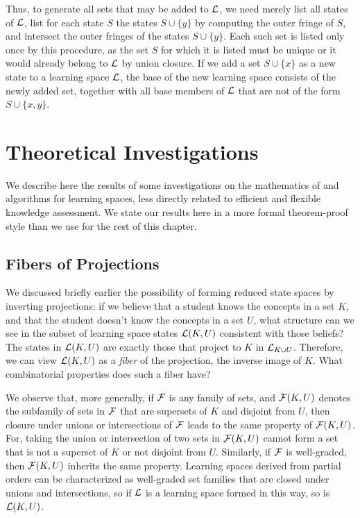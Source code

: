 \documentclass[11pt]{llncs}
\begin{document}
{Thus, to generate all sets that may be added to $\cal L$, we need merely list all states of $\cal L$, list for each state $S$ the states $S\cup\{y\}$ by computing the outer fringe of $S$, and intersect the outer fringes of the states $S\cup\{y\}$. Each such set is listed only once by this procedure, as the set $S$ for which it is listed must be unique or it would already belong to $\cal L$ by union closure. If we add a set $S\cup\{x\}$ as a new state to a learning space $\cal L$, the base of the new learning space consists of the newly added set, together with all base members of $\cal L$ that are not of the form $S\cup\{x,y\}$.

\section{Theoretical Investigations}

We describe here the results of some investigations on the mathematics of and algorithms for learning spaces, less directly related to efficient and flexible knowledge assessment. We state our results here in a more formal theorem-proof style than we use for the rest of this chapter.
 
\subsection{Fibers of Projections}

We discussed briefly earlier the possibility of forming reduced state spaces by inverting projections: if we believe that a student knows the concepts in a set $K$, and that the student doesn't know the concepts in a set $U$, what structure can we see in the subset of learning space states ${\cal L}(K,U)$ consistent with those beliefs? The states in ${\cal L}(K,U)$ are exactly those that project to $K$ in ${\cal L}_{K\cup U}$. Therefore, we can view ${\cal L}(K,U)$ as a \emph{fiber} of the projection, the inverse image of $K$. What combinatorial properties does such a fiber have?

We observe that, more generally, if $\cal F$ is any family of sets, and ${\cal F}(K,U)$ denotes the subfamily of sets in $\cal F$ that are supersets of $K$ and disjoint from $U$, then closure under unions or intersections of $\cal F$ leads to the same property of ${\cal F}(K,U)$. For, taking the union or intersection of two sets in ${\cal F}(K,U)$ cannot form a set that is not a superset of $K$ or not disjoint from $U$.
Similarly, if $\cal F$ is well-graded, then ${\cal F}(K,U)$ inherits the same property.
Learning spaces derived from partial orders can be characterized as well-graded set families that are closed under unions and intersections, so if $\cal L$ is a learning space formed in this way, so is
${\cal L}(K,U)$.

}
\end{document}
